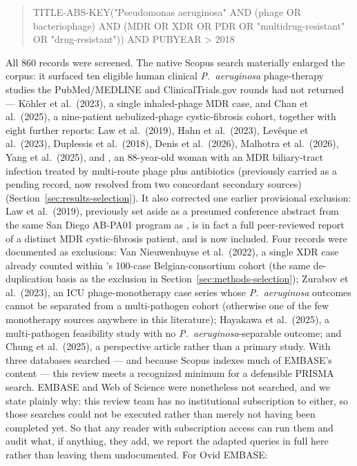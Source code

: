 \begin{quote}
\footnotesize\ttfamily
TITLE-ABS-KEY("Pseudomonas aeruginosa" AND (phage OR bacteriophage) AND (MDR OR XDR OR PDR OR "multidrug-resistant" OR "drug-resistant")) AND PUBYEAR > 2018
\end{quote}

\noindent All 860 records were screened. The native Scopus search materially enlarged the corpus: it surfaced ten eligible human clinical \textit{P.\ aeruginosa} phage-therapy studies the PubMed/MEDLINE and ClinicalTrials.gov rounds had not returned --- K\"ohler et al.\ (2023), a single inhaled-phage MDR case, and Chan et al.\ (2025), a nine-patient nebulized-phage cystic-fibrosis cohort, together with eight further reports: Law et al.\ (2019), Hahn et al.\ (2023), Lev\^eque et al.\ (2023), Duplessis et al.\ (2018), Denis et al.\ (2026), Malhotra et al.\ (2026), Yang et al.\ (2025), and \textcite{Li2025_hlife_biliary}, an 88-year-old woman with an MDR biliary-tract infection treated by multi-route phage plus antibiotics (previously carried as a pending record, now resolved from two concordant secondary sources) (Section~\ref{sec:results-selection}). It also corrected one earlier provisional exclusion: Law et al.\ (2019), previously set aside as a presumed conference abstract from the same San Diego AB-PA01 program as \textcite{Aslam2019_ajt}, is in fact a full peer-reviewed report of a distinct MDR cystic-fibrosis patient, and is now included. Four records were documented as exclusions: Van Nieuwenhuyse et al.\ (2022), a single XDR case already counted within \textcite{Pirnay2024_natmicrobiol}'s 100-case Belgian-consortium cohort (the same de-duplication basis as the \textcite{Dan2023_jid} exclusion in Section~\ref{sec:methods-selection}); Zurabov et al.\ (2023), an ICU phage-monotherapy case series whose \textit{P.\ aeruginosa} outcomes cannot be separated from a multi-pathogen cohort (otherwise one of the few monotherapy sources anywhere in this literature); Hayakawa et al.\ (2025), a multi-pathogen feasibility study with no \textit{P.\ aeruginosa}-separable outcome; and Chung et al.\ (2025), a perspective article rather than a primary study. With three databases searched --- and because Scopus indexes much of EMBASE's content --- this review meets a recognized minimum for a defensible PRISMA search. EMBASE and Web of Science were nonetheless not searched, and we state plainly why: this review team has no institutional subscription to either, so those searches could not be executed rather than merely not having been completed yet. So that any reader with subscription access can run them and audit what, if anything, they add, we report the adapted queries in full here rather than leaving them undocumented. For Ovid EMBASE:

